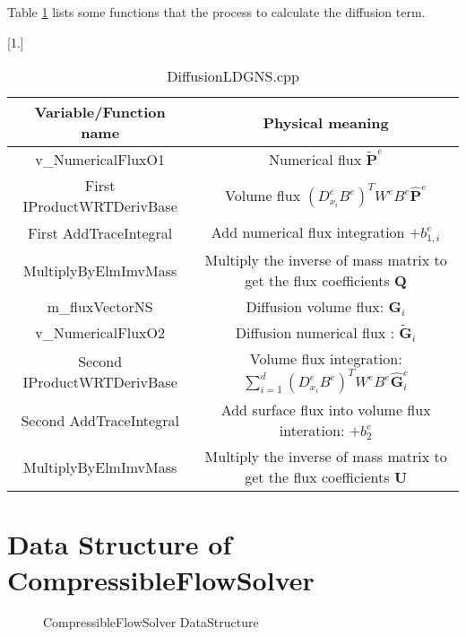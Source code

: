 Table \ref{table3} lists some functions that the process to calculate the diffusion term.
\begin {table}[h]
\caption {DiffusionLDGNS.cpp} \label{table3} 
\begin{center}
\scalebox{0.9}[1.]{
\begin{tabular}{ | c | c|}
\hline      
Variable/Function name & Physical meaning \\  
\hline
v\_NumericalFluxO1  &  Numerical flux $\tilde{\textbf{P}}^{e}$ \\
\hline
First IProductWRTDerivBase & Volume flux $(D^{e}_{x_{i}} B^{e})^{T}W^{e}B^{e}\hat{\textbf{P}}^{e}$\\
\hline
First AddTraceIntegral& Add numerical flux integration $+b_{1,i}^{e}$ \\
\hline
MultiplyByElmImvMass& Multiply the inverse of mass matrix to get the flux coefficients $\textbf{Q}$\\
\hline
m\_fluxVectorNS  & Diffusion volume flux: $\textbf{G}_{i}$\\
\hline
v\_NumericalFluxO2 & Diffusion numerical flux : $\widetilde{\textbf{G}}_{i}$\\
 \hline
Second IProductWRTDerivBase &  Volume flux integration: $\sum\limits_{i=1}^{d}{(D^{e}_{x_{i}} B^{e})^{T}}W^{e}B^{e}\hat{\textbf{G}}^{e}_{i}$ \\
 \hline
Second AddTraceIntegral &  Add surface flux into volume flux interation: $+b_{2}^{e}$\\ 
\hline
MultiplyByElmImvMass& Multiply the inverse of mass matrix to get the flux coefficients $\hat{\textbf{U}}$\\
\hline
\end{tabular}
}
\end{center}
\end{table}







\clearpage
\section{Data Structure of CompressibleFlowSolver}
   \begin{figure}
          \caption{CompressibleFlowSolver DataStructure}\label{fig5}
        \centering
        \begin{turn}{90}
        
        \end{turn}
    \end{figure}

